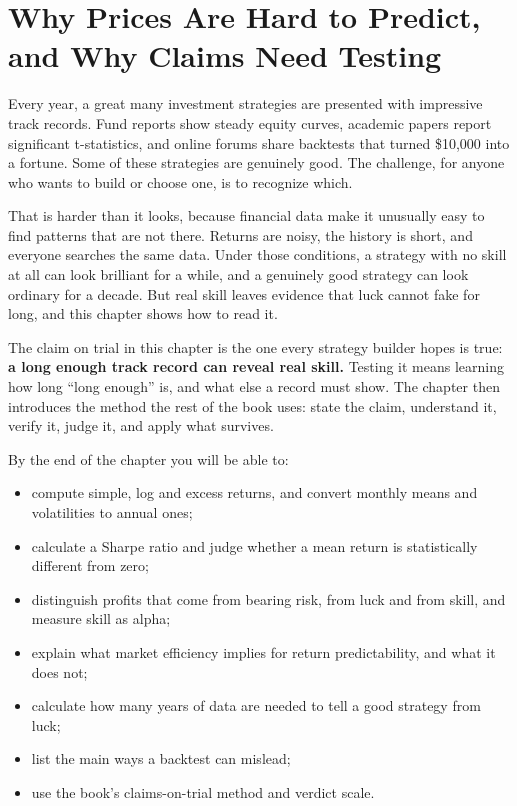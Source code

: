 \makeatletter
{}
\makeatother

\chapter{Why Prices Are Hard to Predict, and Why Claims Need Testing}
\label{ch:01}

Every year, a great many investment strategies are presented with impressive track records. Fund reports show steady equity curves, academic papers report significant t-statistics, and online forums share backtests that turned \$10,000 into a fortune. Some of these strategies are genuinely good. The challenge, for anyone who wants to build or choose one, is to recognize which.

That is harder than it looks, because financial data make it unusually easy to find patterns that are not there. Returns are noisy, the history is short, and everyone searches the same data. Under those conditions, a strategy with no skill at all can look brilliant for a while, and a genuinely good strategy can look ordinary for a decade. But real skill leaves evidence that luck cannot fake for long, and this chapter shows how to read it.

The claim on trial in this chapter is the one every strategy builder hopes is true: \textbf{a long enough track record can reveal real skill.} Testing it means learning how long ``long enough'' is, and what else a record must show. The chapter then introduces the method the rest of the book uses: state the claim, understand it, verify it, judge it, and apply what survives.

By the end of the chapter you will be able to:

\begin{itemize}
  \item compute simple, log and excess returns, and convert monthly means and volatilities to annual ones;
  \item calculate a Sharpe ratio and judge whether a mean return is statistically different from zero;
  \item distinguish profits that come from bearing risk, from luck and from skill, and measure skill as alpha;
  \item explain what market efficiency implies for return predictability, and what it does not;
  \item calculate how many years of data are needed to tell a good strategy from luck;
  \item list the main ways a backtest can mislead;
  \item use the book's claims-on-trial method and verdict scale.
\end{itemize}

